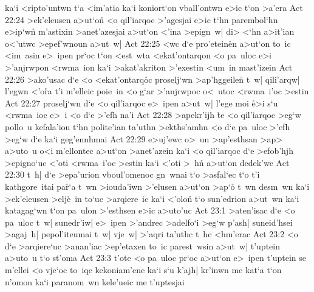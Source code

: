 ka`i
<ripto'untwn
t`a
<im'atia
ka`i
koniort`on
vball'ontwn
e>ic
t`on
>a'era\bibvsend
\vs Act 22:24
>ek'eleusen
a>ut`on\r{}
<o
qil'iarqoc
>'agesjai
e>ic
t`hn
parembol`hn
e>ip`w\r{n}
m'astixin
>anet'azesjai
a>ut`on
<'ina
>epign~w|
di>
<`hn
a>it'ian
o<'utwc
>epef'wnoun
a>ut~w|\bibvsend
\vs Act 22:25
<wc
d`e
pro'etein\r{e}n
a>ut`on
to~ic
<im~asin
e>~ipen
pr`oc
t`on
<est~wta
<ekat'ontarqon
<o
pa~uloc
e>i
>'anjrwpon
<rwma~ion
ka`i
>akat'akriton
>'exestin
<um~in
mast'izein\bibvsend
\vs Act 22:26
>ako'usac
d`e
<o
<ekat'ontarq\r{o}c
proselj`wn
>ap'hggeilen\r{}
t~w|
qili'arqw|
l'egwn
<'o\r{r}a
t'i
m'elleic
poie~in
<o
g`ar
>'anjrwpoc
o<~utoc
<rwma~i'oc
>estin\bibvsend
\vs Act 22:27
proselj`wn
d`e
<o
qil'iarqoc
e>~ipen
a>ut~w|
l'ege
moi
\r{e}>i
s`u
<rwma~ioc
e>~i
<o
d`e
>'efh
na'i\bibvsend
\vs Act 22:28
>apekr'ijh
\r{t}e
<o
qil'iarqoc
>eg`w
pollo~u
kefala'iou
t`hn
polite'ian
ta'uthn
>ekths'amhn
<o
d`e
pa~uloc
>'efh
>eg`w
d`e
ka`i
geg'ennhmai\bibvsend
\vs Act 22:29
e>uj'ewc
o>~un
>ap'esthsan
>ap>
a>uto~u
o<i
m'ellontec
a>ut`on
>anet'azein
ka`i
<o
qil'iarqoc
d`e
>efob'hjh
>epigno`uc
<'oti
<rwma~i'oc
>estin
ka`i
<'oti
>~hn\r{}
a>ut`on
dedek'wc\bibvsend
\vs Act 22:30
t~h|
d`e
>epa'urion
vboul'omenoc
gn~wnai
t`o
>asfal`ec
t`o
t'i
kathgore~itai
pa\r{r}`a
t~wn
>iouda'iwn
>'elusen
a>ut`on
>ap`o\r{}
t~wn
desm~wn
ka`i
>ek'eleusen
>elj\r{e}~in
to`uc
>arqiere~ic
ka`i
<'olon\r{}
t`o
sun'edrion
a>ut~wn
ka`i
katagag`wn
t`on
pa~ulon
>'esthsen
e>ic
a>uto'uc\bibvsend
\vs Act 23:1
>aten'isac
d`e
<o
pa~uloc
t~w|
sunedr'iw|
e>~ipen
>'andrec
>adelfo`i
>eg`w
p'ash|
suneid'hsei
>agaj~h|
pepol'iteumai
t~w|
vje~w|
>'aqri
ta'uthc
t~hc
<hm'erac\bibvsend
\vs Act 23:2
<o
d`e
>arqiere`uc
>anan'iac
>ep'etaxen
to~ic
parest~wsin
a>ut~w|
t'uptein
a>uto~u
t`o
st'oma\bibvsend
\vs Act 23:3
t'ote
<o
pa~uloc
pr`oc
a>ut`on
e>~ipen
t'uptein
se
m'ellei
<o
vje`oc
to~iqe
kekoniam'ene
ka`i
s`u
k'ajh|
kr'inwn
me
kat`a
t`on
n'omon
ka`i
paranom~wn
kele'ueic
me
t'uptesjai\bibvsend
